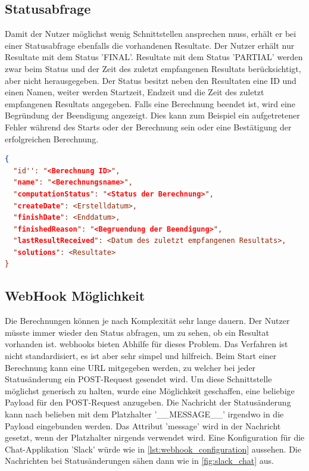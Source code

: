 \subsection{Statusabfrage}
Damit der Nutzer möglichst wenig Schnittstellen ansprechen muss, erhält er bei einer Statusabfrage ebenfalls die vorhandenen Resultate. Der Nutzer erhält nur Resultate mit dem Status 'FINAL'. 
Resultate mit dem Status 'PARTIAL' werden zwar beim Status und der Zeit des zuletzt empfangenen Resultats berücksichtigt, aber nicht herausgegeben. Der Status besitzt neben den 
Resultaten eine ID und einen Namen, weiter werden Startzeit, Endzeit und die Zeit des zuletzt empfangenen Resultats angegeben. Falls eine Berechnung beendet ist, wird eine 
Begründung der Beendigung angezeigt. Dies kann zum Beispiel ein aufgetretener Fehler während des Starts oder der Berechnung sein oder eine Bestätigung der erfolgreichen Berechnung.

\begin{lstlisting}[language=JSON, caption=Aufbau einer Antwort auf eine Statusabfrage, label=lst:status_response]  
{
  "id'': "<Berechnung ID>",
  "name": "<Berechnungsname>",
  "computationStatus": "<Status der Berechnung>",
  "createDate": <Erstelldatum>,
  "finishDate": <Enddatum>,
  "finishedReason": "<Begruendung der Beendigung>",
  "lastResultReceived": <Datum des zuletzt empfangenen Resultats>,
  "solutions": <Resultate>
}
\end{lstlisting}

\subsection{WebHook Möglichkeit}
Die Berechnungen können je nach Komplexität sehr lange dauern. Der Nutzer müsste immer wieder den Status abfragen, um zu sehen, ob ein Resultat vorhanden ist. \glspl{webhook} 
bieten Abhilfe für dieses Problem. Das Verfahren ist nicht standardisiert, es ist aber sehr simpel und hilfreich. Beim Start einer Berechnung kann eine URL mitgegeben werden, zu welcher 
bei jeder Statusänderung ein POST-Request gesendet wird. Um diese Schnittstelle möglichst generisch zu halten, wurde eine Möglichkeit geschaffen, eine beliebige Payload für den 
POST-Request anzugeben. Die Nachricht der Statusänderung kann nach belieben mit dem Platzhalter '\_\_MESSAGE\_\_' irgendwo in die Payload eingebunden werden. Das Attribut 'message' 
wird in der Nachricht gesetzt, wenn der Platzhalter nirgends verwendet wird. Eine Konfiguration für die Chat-Applikation 'Slack' würde wie in \autoref{lst:webhook_configuration} 
aussehen. Die Nachrichten bei Statusänderungen sähen dann wie in \autoref{fig:slack_chat} aus.


